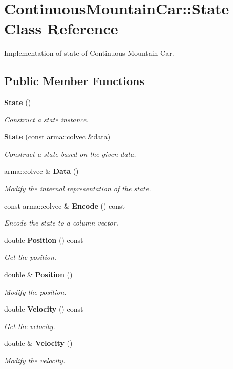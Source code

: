 \section{Continuous\+Mountain\+Car\+:\+:State Class Reference}
\label{classmlpack_1_1rl_1_1ContinuousMountainCar_1_1State}


Implementation of state of Continuous Mountain Car.  


\subsection*{Public Member Functions}
\begin{DoxyCompactItemize}
\item 
\textbf{ State} ()
\begin{DoxyCompactList}\small\item\em Construct a state instance. \end{DoxyCompactList}\item 
\textbf{ State} (const arma\+::colvec \&data)
\begin{DoxyCompactList}\small\item\em Construct a state based on the given data. \end{DoxyCompactList}\item 
arma\+::colvec \& \textbf{ Data} ()
\begin{DoxyCompactList}\small\item\em Modify the internal representation of the state. \end{DoxyCompactList}\item 
const arma\+::colvec \& \textbf{ Encode} () const
\begin{DoxyCompactList}\small\item\em Encode the state to a column vector. \end{DoxyCompactList}\item 
double \textbf{ Position} () const
\begin{DoxyCompactList}\small\item\em Get the position. \end{DoxyCompactList}\item 
double \& \textbf{ Position} ()
\begin{DoxyCompactList}\small\item\em Modify the position. \end{DoxyCompactList}\item 
double \textbf{ Velocity} () const
\begin{DoxyCompactList}\small\item\em Get the velocity. \end{DoxyCompactList}\item 
double \& \textbf{ Velocity} ()
\begin{DoxyCompactList}\small\item\em Modify the velocity. \end{DoxyCompactList}\end{DoxyCompactItemize}
